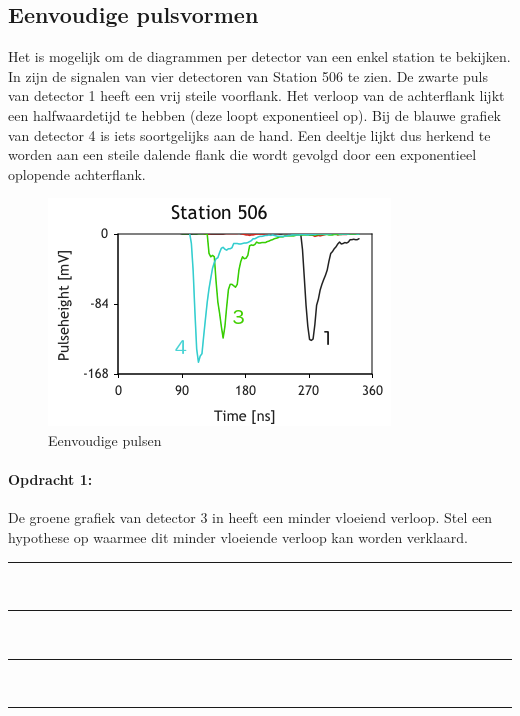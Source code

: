 \subsection{Eenvoudige pulsvormen}

Het is mogelijk om de diagrammen per detector van een enkel station
te bekijken. In  zijn de signalen
van vier detectoren van Station 506 te zien. De zwarte puls van detector
1 heeft een vrij steile voorflank. Het verloop van de achterflank
lijkt een halfwaardetijd te hebben (deze loopt exponentieel op). Bij
de blauwe grafiek van detector 4 is iets soortgelijks aan de hand.
Een deeltje lijkt dus herkend te worden aan een steile dalende flank
die wordt gevolgd door een exponentieel oplopende achterflank.

\begin{figure}[ht]
    \centering
    \includegraphics[scale=0.65]{Figures/Traces506}
    \caption{Eenvoudige pulsen}
    \label{fig:Eenvoudige-pulsen}
\end{figure}


\begin{minipage}[t]{1\columnwidth}%

\paragraph{Opdracht 1:}

De groene grafiek van detector 3 in 
heeft een minder vloeiend verloop. Stel een hypothese op waarmee dit
minder vloeiende verloop kan worden verklaard.

\begin{center}
    \rule{\textwidth}{0.3mm}\\
    \rule{\textwidth}{0.3mm}\\
    \rule{\textwidth}{0.3mm}\\
    \rule{\textwidth}{0.3mm}\\
\end{center}
\end{minipage}

